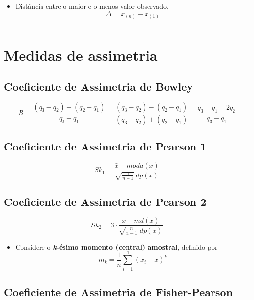 \documentclass[
]{book}
\providecommand{\tightlist}{%
  \setlength{\itemsep}{0pt}\setlength{\parskip}{0pt}}
\begin{document}
\begin{itemize}
\tightlist
\item
  Distância entre o maior e o menos valor observado.
  \[\Delta = x_{(n)} - x_{(1)}\]
\end{itemize}

\begin{center}\rule{0.5\linewidth}{0.5pt}\end{center}

\section{Medidas de assimetria}\label{medidas-de-assimetria}

\subsection{Coeficiente de Assimetria de Bowley}\label{coeficiente-de-assimetria-de-bowley}

\[B = \frac{(q_3-q_2)-(q_2-q_1)}{q_3-q_1} = \frac{(q_3-q_2)-(q_2-q_1)}{(q_3-q_2)+(q_2-q_1)} = \frac{q_3+q_1-2q_2}{q_3-q_1}\]

\subsection{Coeficiente de Assimetria de Pearson 1}\label{coeficiente-de-assimetria-de-pearson-1}

\[Sk_1 = \frac{\bar{x}-moda(x)}{\sqrt{\frac{n}{n-1}}~dp(x)}\]

\subsection{Coeficiente de Assimetria de Pearson 2}\label{coeficiente-de-assimetria-de-pearson-2}

\[Sk_2 = 3\cdot\frac{\bar{x}-md(x)}{\sqrt{\frac{n}{n-1}}~dp(x)}\]

\begin{itemize}
\tightlist
\item
  Considere o \textbf{\emph{k}-ésimo momento (central) amostral}, definido por \[m_k = \frac{1}{n}\sum_{i=1}^{n}\left(x_i-\bar{x}\right)^k\]
\end{itemize}

\subsection{Coeficiente de Assimetria de Fisher-Pearson}\label{coeficiente-de-assimetria-de-fisher-pearson}
\end{document}
